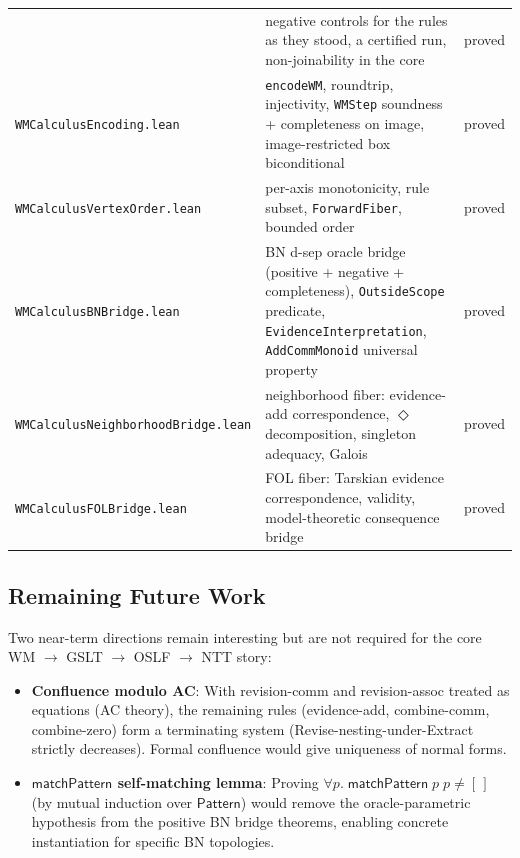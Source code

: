 \documentclass[11pt,openany]{report}
\begin{document}
\begin{center}
\begin{tabular}{lll}
  & negative controls for the rules as they stood, a certified run,
    non-joinability in the core
  & proved \\
\texttt{WMCalculusEncoding.lean}
  & \texttt{encodeWM}, roundtrip, injectivity,
    \texttt{WMStep} soundness + completeness on image,
    image-restricted box biconditional
  & proved \\
\texttt{WMCalculusVertexOrder.lean}
  & per-axis monotonicity, rule subset,
    \texttt{ForwardFiber}, bounded order
  & proved \\
\texttt{WMCalculusBNBridge.lean}
  & BN d-sep oracle bridge (positive + negative + completeness),
    \texttt{OutsideScope} predicate, \texttt{EvidenceInterpretation},
    \texttt{AddCommMonoid} universal property
  & proved \\
\texttt{WMCalculusNeighborhoodBridge.lean}
  & neighborhood fiber: evidence-add correspondence,
    $\Diamond$ decomposition, singleton adequacy, Galois
  & proved \\
\texttt{WMCalculusFOLBridge.lean}
  & FOL fiber: Tarskian evidence correspondence,
    validity, model-theoretic consequence bridge
  & proved \\
\bottomrule
\end{tabular}
\end{center}

\subsection{Remaining Future Work}

Two near-term directions remain interesting but are not required for the
core WM $\to$ GSLT $\to$ OSLF $\to$ NTT story:

\begin{itemize}
\item \textbf{Confluence modulo AC}:
  With revision-comm and revision-assoc treated as equations
  (AC theory), the remaining rules (evidence-add, combine-comm,
  combine-zero) form a terminating system (Revise-nesting-under-Extract
  strictly decreases).  Formal confluence would give uniqueness of
  normal forms.

\item \textbf{$\mathsf{matchPattern}$ self-matching lemma}:
  Proving $\forall p.\; \mathsf{matchPattern}\;p\;p \ne [\,]$
  (by mutual induction over $\mathsf{Pattern}$) would remove the
  oracle-parametric hypothesis from the positive BN bridge theorems,
  enabling concrete instantiation for specific BN topologies.
\end{itemize}
\end{document}
